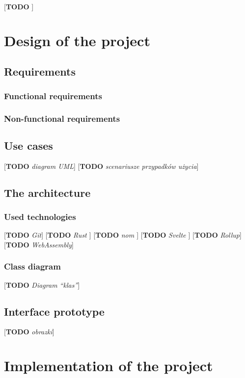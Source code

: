 \documentclass[english,engineering]{wizthesis}
\newcommand{\todo}[1]{{\color{red}[\textbf{TODO} \textit{#1}]}}
\begin{document}
\todo{\cite{regex101}}

\chapter{Design of the project}

\section{Requirements}

\subsection{Functional requirements}

\subsection{Non-functional requirements}

\section{Use cases}

\todo{diagram UML}
\todo{scenariusze przypadków użycia}

\section{The architecture}

\subsection{Used technologies}

\todo{Git}
\todo{Rust \cite{rust-book}}
\todo{nom \cite{couprie-2015}}
\todo{Svelte \cite{svelte-docs}}
\todo{Rollup}
\todo{WebAssembly}

\subsection{Class diagram}

\todo{Diagram ``klas''}

\section{Interface prototype}

\todo{obrazki}

\chapter{Implementation of the project}
\end{document}
